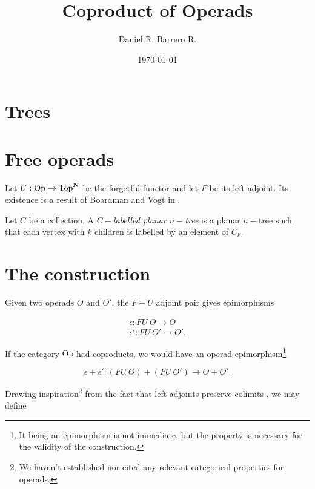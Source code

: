 \documentclass{amsart}
\title{Coproduct of Operads}
\author{Daniel R. Barrero R.}
\date{\today}
\begin{document}

\maketitle

\section{Trees}

\section{Free operads}

Let $U : \mathrm{Op} \to \mathrm{Top}^{\mathbf{N}}$ be the forgetful functor and
let $F$ be its left adjoint. Its existence is a result of Boardman and Vogt
in \cite{bv-hiasots}.

\begin{defn}
	Let $C$ be a collection. A \emph{$C-$labelled planar $n-$tree} is a
	planar $n-$tree such that each vertex with $k$ children is labelled
	by an element of $C_k$.
\end{defn}

	

\section{The construction}

Given two operads $O$ and $O'$, the $F-U$ adjoint pair gives epimorphisms 

\begin{eqnarray}\label{fu-epis}
	\epsilon : FU \ O \to O \\
	\epsilon' : FU \ O' \to O'.
\end{eqnarray}

If the category $\mathrm{Op}$ had coproducts, we would have an operad
epimorphism\footnote{It being an epimorphism is not immediate, but the
property is necessary for the validity of the construction.}

\begin{equation}\label{cpd-epis}
	\epsilon + \epsilon' : (FU \ O) + (FU \ O') \to O + O'.
\end{equation}

Drawing inspiration\footnote{We haven't established nor cited any relevant
categorical properties for operads.} from the fact that left adjoints
preserve colimits \cite{riehl-ctic}, we may define
\end{document}
